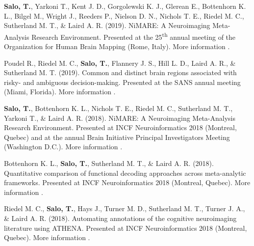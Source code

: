 \documentclass[10pt]{article}
\newcommand{\sectionstyle}{\LARGE \fontfamily{lmr}\selectfont}
\newcommand{\textlink}[3][blue]{\href{#2}{\color{#1}{#3}}}
\begin{document}
\bigskip

\begin{center}\sectionstyle{POSTERS}\end{center}

\begin{hangparas}{.25in}{1}

	\textbf{Salo, T.}, Yarkoni T., Kent J. D., Gorgolewski K. J., Glerean E.,
	Bottenhorn K. L., Bilgel M., Wright J., Reeders P., Nielson D. N.,
	Nichols T. E., Riedel M. C., Sutherland M. T., \& Laird A. R. (2019).
	NiMARE: A Neuroimaging Meta-Analysis Research Environment.
	Presented at the 25\textsuperscript{th} annual meeting of the Organization
	for Human Brain Mapping (Rome, Italy).
	More information
	\textlink{https://ww5.aievolution.com/hbm1901/index.cfm?do=abs.viewAbs&abs=4138}{here}.

	\bigskip

	Poudel R., Riedel M. C., \textbf{Salo, T.}, Flannery J. S., Hill L. D.,
	Laird A. R., \& Sutherland M. T. (2019).
	Common and distinct brain regions associated with risky- and ambiguous decision-making.
	Presented at the SANS annual meeting (Miami, Florida).
	More information
	\textlink{https://nbclab.github.io/posters/poudel-sans-poster}{here}.

	\bigskip

	\textbf{Salo, T.}, Bottenhorn K. L., Nichols T. E., Riedel M. C.,
	Sutherland M. T., Yarkoni T., \& Laird A. R. (2018).
	NiMARE: A Neuroimaging Meta-Analysis Research Environment.
	Presented at INCF Neuroinformatics 2018 (Montreal, Quebec) and at the annual
	Brain Initiative Principal Investigators Meeting (Washington D.C.).
	More information
	\textlink{https://f1000research.com/posters/7-1221}{here}.

	\bigskip

	Bottenhorn K. L., \textbf{Salo, T.}, Sutherland M. T., \& Laird A. R. (2018).
	Quantitative comparison of functional decoding approaches across meta-analytic
	frameworks.
	Presented at INCF Neuroinformatics 2018 (Montreal, Quebec).
	More information
	\textlink{https://f1000research.com/posters/7-1222}{here}.

	\bigskip

	Riedel M. C., \textbf{Salo, T.}, Hays J., Turner M. D., Sutherland M. T.,
	Turner J. A., \& Laird A. R. (2018).
	Automating annotations of the cognitive neuroimaging literature using ATHENA.
	Presented at INCF Neuroinformatics 2018 (Montreal, Quebec).
	More information
	\textlink{https://f1000research.com/posters/7-1229}{here}.


\end{hangparas}
\end{document}
